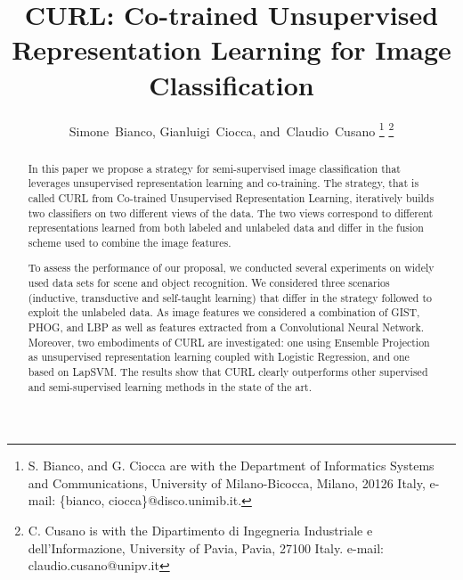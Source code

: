 \documentclass[journal,11pt]{IEEEtran}
\newcommand{\ADD}[1]{#1}
\newcommand{\coso}{strategy}
\newcommand{\emb}{embodiment}
\begin{document}
\title{CURL: Co-trained Unsupervised Representation Learning for Image Classification}

\author{Simone~Bianco,
        Gianluigi~Ciocca,
        and~Claudio~Cusano%
\thanks{S. Bianco, and G. Ciocca are with the Department
of Informatics Systems and Communications, University of Milano-Bicocca, Milano,
20126 Italy, e-mail: \{bianco, ciocca\}@disco.unimib.it.}
\thanks{C. Cusano is with the Dipartimento di Ingegneria Industriale e dell'Informazione, University of Pavia, Pavia, 27100 Italy. e-mail: claudio.cusano@unipv.it}
}



\maketitle

\begin{abstract}
In this paper we propose a \coso{ }for semi-supervised image classification that leverages unsupervised representation learning and co-training. The \coso, that is called CURL from Co-trained Unsupervised Representation Learning, iteratively builds two classifiers on two different views of the data.
The two views correspond to different representations learned from both labeled and unlabeled data and differ in the fusion scheme used to combine the image features.

To assess the performance of our proposal, we conducted several experiments on widely used data sets for scene and object recognition.  We considered three scenarios (inductive, transductive  and self-taught learning) that differ in the strategy followed to exploit the unlabeled data. \ADD{As image features we considered a combination of GIST, PHOG, and LBP as well as features extracted from a Convolutional Neural Network. Moreover, two \emb{s} of CURL are investigated: one using Ensemble Projection as unsupervised representation learning coupled with Logistic Regression, and one based on LapSVM.} The results show that CURL clearly outperforms other supervised and semi-supervised learning methods in the state of the art.

\end{abstract}
\end{document}

